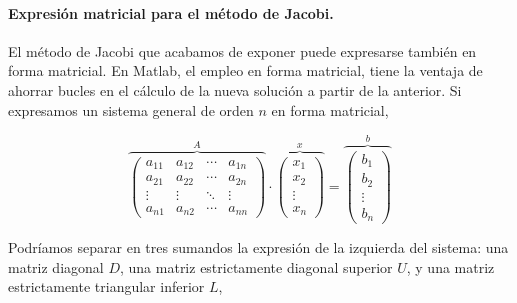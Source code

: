 \paragraph{Expresión matricial para el método de Jacobi.}  El método de Jacobi que acabamos de exponer puede expresarse también en forma matricial. En Matlab, el empleo en forma matricial, tiene la ventaja de ahorrar bucles en el cálculo de la nueva solución a partir de la anterior. Si expresamos un sistema general de orden $n$ en forma matricial,

\begin{equation*}
\overbrace{\begin{pmatrix}
a_{11}& a_{12}& \cdots & a_{1n}\\
a_{21}& a_{22}& \cdots & a_{2n}\\
\vdots & \vdots & \ddots & \vdots\\
a_{n1}& a_{n2}& \cdots & a_{nn}
\end{pmatrix}}^A \cdot \overbrace{\begin{pmatrix}
x_1\\
x_2\\
\vdots \\
x_n
\end{pmatrix}}^x=\overbrace{\begin{pmatrix}
b_1\\
b_2\\
\vdots \\
b_n
\end{pmatrix}}^b
\end{equation*}

Podríamos separar en tres sumandos la expresión de la izquierda del sistema: una matriz diagonal $D$, una matriz estrictamente diagonal superior $U$, y una matriz estrictamente triangular inferior $L$,

